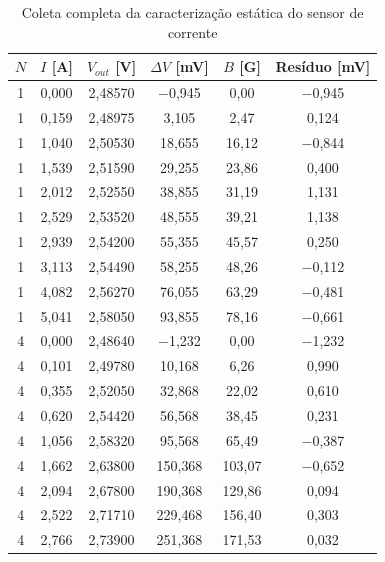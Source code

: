 \begin{apendicesenv}
\begin{table}[H]
    \centering
    \caption{Coleta completa da caracterização estática do sensor de corrente}
    \label{tab:hall_dados_brutos}
    \small
    \begin{tabular}{cccccc}
        \toprule
        \textbf{$N$} & \textbf{$I$ [\si{\ampere}]} &
        \textbf{$V_{out}$ [\si{\volt}]} & \textbf{$\Delta V$ [\si{\milli\volt}]} &
        \textbf{$B$ [G]} & \textbf{Resíduo [\si{\milli\volt}]} \\
        \midrule
        1 & 0{,}000 & 2{,}48570 & $-$0{,}945 & 0{,}00 & $-$0{,}945 \\
        1 & 0{,}159 & 2{,}48975 & 3{,}105 & 2{,}47 & 0{,}124 \\
        1 & 1{,}040 & 2{,}50530 & 18{,}655 & 16{,}12 & $-$0{,}844 \\
        1 & 1{,}539 & 2{,}51590 & 29{,}255 & 23{,}86 & 0{,}400 \\
        1 & 2{,}012 & 2{,}52550 & 38{,}855 & 31{,}19 & 1{,}131 \\
        1 & 2{,}529 & 2{,}53520 & 48{,}555 & 39{,}21 & 1{,}138 \\
        1 & 2{,}939 & 2{,}54200 & 55{,}355 & 45{,}57 & 0{,}250 \\
        1 & 3{,}113 & 2{,}54490 & 58{,}255 & 48{,}26 & $-$0{,}112 \\
        1 & 4{,}082 & 2{,}56270 & 76{,}055 & 63{,}29 & $-$0{,}481 \\
        1 & 5{,}041 & 2{,}58050 & 93{,}855 & 78{,}16 & $-$0{,}661 \\
        \midrule
        4 & 0{,}000 & 2{,}48640 & $-$1{,}232 & 0{,}00 & $-$1{,}232 \\
        4 & 0{,}101 & 2{,}49780 & 10{,}168 & 6{,}26 & 0{,}990 \\
        4 & 0{,}355 & 2{,}52050 & 32{,}868 & 22{,}02 & 0{,}610 \\
        4 & 0{,}620 & 2{,}54420 & 56{,}568 & 38{,}45 & 0{,}231 \\
        4 & 1{,}056 & 2{,}58320 & 95{,}568 & 65{,}49 & $-$0{,}387 \\
        4 & 1{,}662 & 2{,}63800 & 150{,}368 & 103{,}07 & $-$0{,}652 \\
        4 & 2{,}094 & 2{,}67800 & 190{,}368 & 129{,}86 & 0{,}094 \\
        4 & 2{,}522 & 2{,}71710 & 229{,}468 & 156{,}40 & 0{,}303 \\
        4 & 2{,}766 & 2{,}73900 & 251{,}368 & 171{,}53 & 0{,}032 \\

\end{tabular}
\end{table}
\end{apendicesenv}
